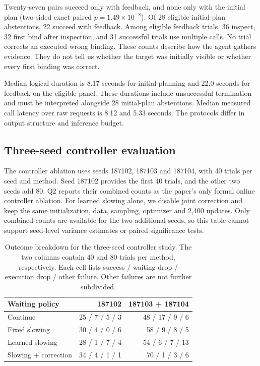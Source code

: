 Twenty-seven pairs succeed only with feedback, and none only with the initial plan (two-sided exact paired $p=1.49\times10^{-8}$). Of 28 eligible initial-plan abstentions, 22 succeed with feedback. Among eligible feedback trials, 36 inspect, 32 first bind after inspection, and 31 successful trials use multiple calls. No trial corrects an executed wrong binding. These counts describe how the agent gathers evidence. They do not tell us whether the target was initially visible or whether every first binding was correct.

Median logical duration is 8.17 seconds for initial planning and 22.0 seconds for feedback on the eligible panel. These durations include unsuccessful termination and must be interpreted alongside 28 initial-plan abstentions. Median measured call latency over raw requests is 8.12 and 5.33 seconds. The protocols differ in output structure and inference budget.

\subsection{Three-seed controller evaluation}
\label{sec:collaborator-waiting}
The controller ablation uses seeds 187102, 187103 and 187104, with 40 trials per seed and method. Seed 187102 provides the first 40 trials, and the other two seeds add 80. Q2 reports their combined counts as the paper's only formal online controller ablation. For learned slowing alone, we disable joint correction and keep the same initialization, data, sampling, optimizer and 2,400 updates. Only combined counts are available for the two additional seeds, so this table cannot support seed-level variance estimates or paired significance tests.

\begin{table}[h]
\centering\small
\setlength{\tabcolsep}{3pt}
\begin{tabular}{lrr}
\toprule
Waiting policy & 187102 & 187103 + 187104\\
\midrule
Continue & 25 / 7 / 5 / 3 & 48 / 17 / 9 / 6\\
Fixed slowing & 30 / 4 / 0 / 6 & 58 / 9 / 8 / 5\\
Learned slowing & 28 / 1 / 7 / 4 & 54 / 6 / 7 / 13\\
Slowing + correction & 34 / 4 / 1 / 1 & 70 / 1 / 3 / 6\\
\bottomrule
\end{tabular}
\caption{Outcome breakdown for the three-seed controller study. The two columns contain 40 and 80 trials per method, respectively. Each cell lists success / waiting drop / execution drop / other failure. Other failures are not further subdivided.}
\label{tab:collaborator-waiting}
\end{table}


